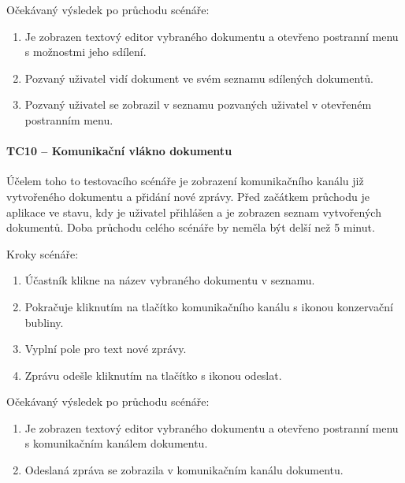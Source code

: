 Očekávaný výsledek po průchodu scénáře:
\begin{enumerate}
    \item Je zobrazen textový editor vybraného dokumentu a otevřeno postranní menu s možnostmi jeho sdílení.
    \item Pozvaný uživatel vidí dokument ve svém seznamu sdílených dokumentů.
    \item Pozvaný uživatel se zobrazil v seznamu pozvaných uživatel v otevřeném postranním menu.
\end{enumerate}

\paragraph{TC10 -- Komunikační vlákno dokumentu}

Účelem toho to testovacího scénáře je zobrazení komunikačního kanálu již vytvořeného dokumentu a přidání nové zprávy.
Před začátkem průchodu je aplikace ve stavu, kdy je uživatel přihlášen a je zobrazen seznam vytvořených dokumentů.
Doba průchodu celého scénáře by neměla být delší než 5 minut.

Kroky scénáře:
\begin{enumerate}
    \item Účastník klikne na název vybraného dokumentu v seznamu.
    \item Pokračuje kliknutím na tlačítko komunikačního kanálu s ikonou konzervační bubliny.
    \item Vyplní pole pro text nové zprávy.
    \item Zprávu odešle kliknutím na tlačítko s ikonou odeslat.
\end{enumerate}

Očekávaný výsledek po průchodu scénáře:
\begin{enumerate}
    \item Je zobrazen textový editor vybraného dokumentu a otevřeno postranní menu s komunikačním kanálem dokumentu.
    \item Odeslaná zpráva se zobrazila v komunikačním kanálu dokumentu.
\end{enumerate}
